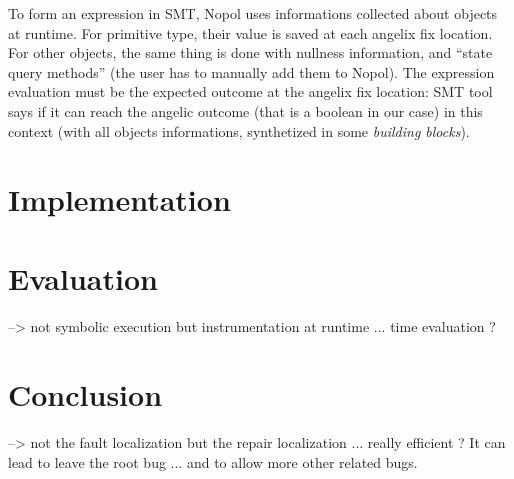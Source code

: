 To form an expression in SMT, \textsf{Nopol} uses informations collected about objects at runtime. For primitive type, their value is saved at each angelix fix location. For other objects, the same thing is done with nullness information, and ``state query methods'' (the user has to manually add them to \textsf{Nopol}). The expression evaluation must be the expected outcome at the angelix fix location: SMT tool says if it can reach the angelic outcome (that is a boolean in our case) in this context (with all objects informations, synthetized in some \emph{building blocks}). 

\section{Implementation}



\section{Evaluation}

--> not symbolic execution but instrumentation at runtime ... time evaluation ?

\section{Conclusion}

--> not the fault localization but the repair localization ... really efficient ? It can lead to leave the root bug ... and to allow more other related bugs.

